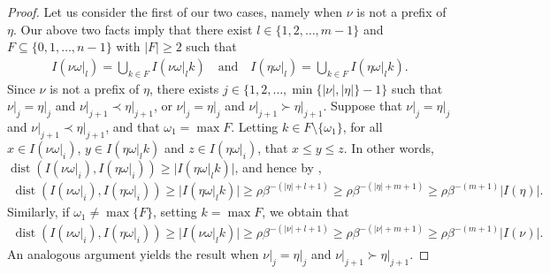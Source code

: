 \documentclass[a4paper,reqno,10pt]{amsart}
\begin{document}
\begin{proof}
Let us consider the first of our two cases, namely when $\nu$ is not a prefix of $\eta$. Our above two facts imply that there exist $l \in \{1, 2, \ldots, m-1\}$ and $F \subseteq \{0, 1, \ldots, n-1\}$ with $\lvert F \rvert \geq 2$ such that
    \begin{align}\label{eq:HY-splitting_of_cylinders}
        I(\nu \omega\vert_{l}) = \bigcup_{k \in F} I(\nu \omega\vert_{l} k)
        \quad \text{and} \quad
        I(\eta \omega\vert_{l}) = \bigcup_{k \in F} I(\eta \omega\vert_{l} k).
    \end{align}
Since $\nu$ is not a prefix of $\eta$, there exists $j \in \{ 1, 2, \ldots, \min\{\lvert \nu \rvert, \lvert \eta \rvert \} - 1 \}$ such that $\nu\vert_{j} = \eta\vert_{j}$ and $\nu\vert_{j+1} \prec \eta\vert_{j+1}$, or $\nu\vert_{j} = \eta\vert_{j}$ and $\nu\vert_{j+1} \succ \eta\vert_{j+1}$.  Suppose that $\nu\vert_{j} = \eta\vert_{j}$ and $\nu\vert_{j+1} \prec \eta\vert_{j+1}$, and that $\omega_{1} = \max F$. Letting $k \in F \setminus \{\omega_{1}\}$, for all $x \in I(\nu \omega\vert_{i})$, $y \in I(\eta \omega\vert_{l} k)$ and $z \in I(\eta \omega\vert_{i})$, that $x \leq y \leq z$.  In other words, $\operatorname{dist}(I(\nu\omega\vert_{i}), I(\eta\omega\vert_{i})) \geq \lvert I(\eta \omega\vert_{l} k)\rvert$, and hence by ,
    \begin{align*}
        \operatorname{dist}(I(\nu\omega\vert_{i}), I(\eta\omega\vert_{i}))
        \geq \lvert I(\eta \omega\vert_{l} k)\rvert
        \geq \rho \beta^{-(\lvert \eta \rvert + l + 1 )}
        \geq \rho \beta^{-(\lvert \eta \rvert + m + 1)}
        \geq \rho \beta^{-(m + 1)} \lvert I(\eta) \rvert.
    \end{align*}
Similarly, if $\omega_{1} \neq \max\{F\}$, setting $k = \max F$, we obtain that
    \begin{align*}
        \operatorname{dist}(I(\nu\omega\vert_{i}), I(\eta\omega\vert_{i}))
        \geq \lvert I(\nu \omega\vert_{l} k)\rvert
        \geq \rho \beta^{-(\lvert \nu \rvert + l + 1 )}
        \geq \rho \beta^{-(\lvert \nu \rvert + m + 1)}
        \geq \rho \beta^{-(m + 1)} \lvert I(\nu) \rvert.
    \end{align*}
An analogous argument yields the result when $\nu\vert_{j} = \eta\vert_{j}$ and $\nu\vert_{j+1} \succ \eta\vert_{j+1}$.


\end{proof}
\end{document}
